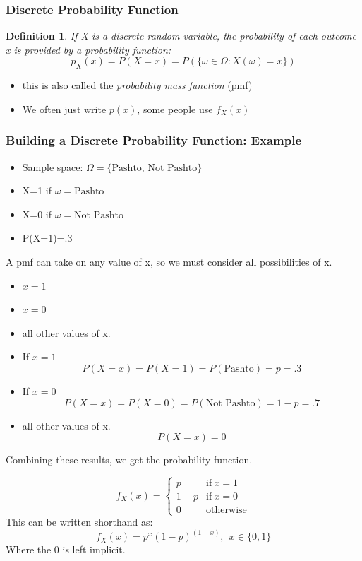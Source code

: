 \documentclass{beamer}
\newtheorem{defn}{Definition}
\numberwithin{equation}{section}
\begin{document}
\begin{frame}
\frametitle{Discrete Probability Function}
\begin{defn}

If X is a discrete random variable, the probability of each outcome x is provided by a probability function:
$$p_X(x)=P(X=x)=P(\{\omega \in \Omega: X(\omega)=x\})$$

\end{defn}
\begin{itemize}
\item this is also called the \emph{probability mass function} (pmf)
\item We often just write $p(x)$, some people use $f_X(x)$
\end{itemize}

\end{frame}

\begin{frame}
\frametitle{Building a Discrete Probability Function: Example}
\begin{itemize}
\item Sample space: $\Omega= \{\text{Pashto, Not Pashto}\}$
\item X=1 if $\omega=\text{Pashto}$
\item X=0 if $\omega=\text{Not Pashto}$ 
\item P(X=1)=.3
\end{itemize}
A pmf can take on any value of x, so we must consider all possibilities of x.
\begin{itemize}
\item $x = 1$
\item $x = 0$
\item all other values of x.
\end{itemize}
\end{frame}


\begin{frame}
\begin{itemize}
\item If $x = 1$
$$P(X=x)=P(X=1)=P(\text{Pashto})=p=.3$$\pause
\item If $x = 0$
$$P(X=x)=P(X=0)=P(\text{Not Pashto})=1-p=.7$$\pause
\item all other values of x.
$$P(X=x)=0$$
\end{itemize}\pause
Combining these results, we get the probability function.

$$f_X(x)=\begin{cases}
p & \text{if}\ x=1\\
1-p & \text{if}\ x=0\\
0 & \text{otherwise}
\end{cases}$$\pause
This can be written shorthand as:
$$f_X(x)=p^x(1-p)^{(1-x)},\ \ x\in \{0,1\}$$ 
Where the 0 is left implicit.

\end{frame}
\end{document}
